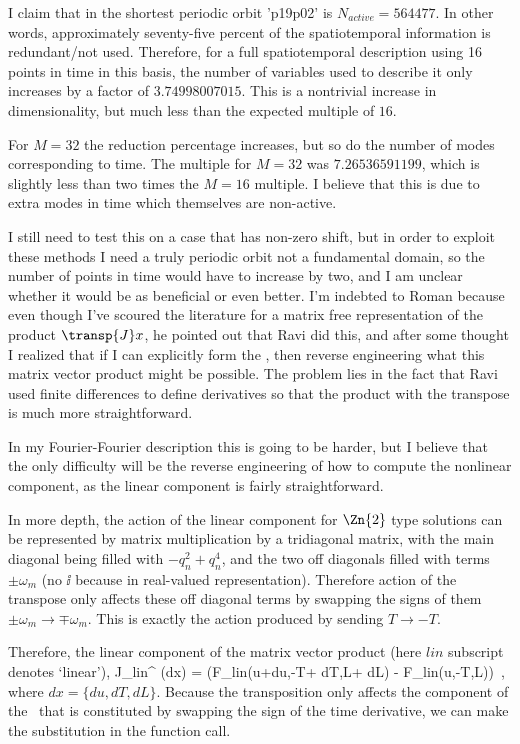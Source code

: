 I claim that in the shortest periodic orbit 'p19p02' is
$N_{active} = 564477$. In other words, approximately seventy-five percent of the spatiotemporal information is redundant/not used.
Therefore, for a full spatiotemporal description using 16 points in time in this basis, the number of variables used
to describe it only increases by a factor of $3.74998007015$. This is a nontrivial increase in dimensionality,
but much less than the expected multiple of $16$.

For $M=32$ the reduction percentage increases, but so do the number of modes corresponding to time. The multiple for
$M=32$ was $7.26536591199$,  which is slightly less than two times the $M=16$ multiple. I believe that this is due
to extra modes in time which themselves are non-active.

I still need to test this on a case that has non-zero shift, but in order to exploit these methods I need a truly periodic
orbit not a fundamental domain, so the number of points in time would have to increase by two, and I am unclear whether
it would be as beneficial or even better.
I'm indebted to Roman because even though I've scoured the literature for a
matrix free representation of the product $\transp{J} x$, he pointed out that
Ravi did this, and after some thought I realized that if I can explicitly
form the \jacobianM, then reverse engineering what this matrix vector product
might be possible. The problem lies in the fact that Ravi used finite
differences to define derivatives so that the product with the transpose is
much more straightforward.

In my Fourier-Fourier description this is going to be harder, but I believe
that the only difficulty will be the reverse engineering of how to compute
the nonlinear component, as the linear component is fairly straightforward.

In more depth, the action of the linear component for $\Zn{2}$ type solutions
can be represented by matrix multiplication by a tridiagonal matrix, with the
main diagonal being filled with $-q_n^2 +q_n^4$, and the two off diagonals
filled with terms $\pm \omega_m$ (no $\ii$ because in real-valued
representation). Therefore action of the transpose only affects these off
diagonal terms by swapping the signs of them $\pm \omega_m \rightarrow \mp
\omega_m$. This is exactly the action produced by sending $T \rightarrow -T$.

Therefore, the linear component of the matrix vector product (here $lin$
subscript denotes `linear'),
\beq
J_{lin}^{\top} (\epsilon dx)
= 
(F_{lin}(u+\epsilon du,-T+ \epsilon dT,L+ \epsilon dL) - F_{lin}(u,-T,L))
\,,
where $dx = \{du,dT,dL\}$.
Because the transposition only affects the component of the \jacobianM\ that is
constituted by swapping the sign of the time derivative, we can make the
substitution in the function call.

